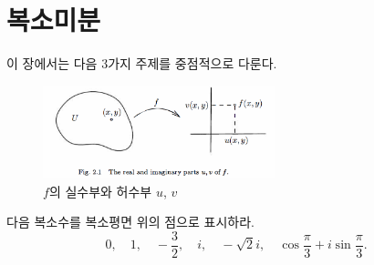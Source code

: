 
\chapter{복소미분}

이 장에서는 다음 3가지 주제를 중점적으로 다룬다.




\begin{figure}[!h]
\begin{center}
\includegraphics[width=0.6\textwidth]{./SaltChapter/fig-2-1}
\end{center}
\caption{$f$의 실수부와 허수부 $u$, $v$}
\label{fig-2-1}
\end{figure}



\begin{salt_exercise} \label{ex-1-4}
다음 복소수를 복소평면 위의 점으로 표시하라.
$$
0, \quad 1 , \quad -\frac32, \quad i, \quad -\sqrt{2}i,
\quad \cos \frac\pi3 + i\sin\frac\pi3.
$$
\end{salt_exercise}